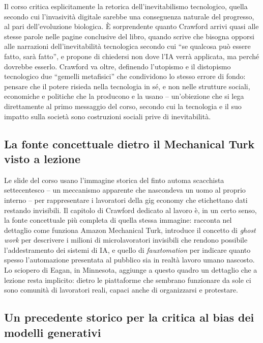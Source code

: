 \documentclass[a4paper,11pt]{article}
\begin{document}
Il corso critica esplicitamente la retorica dell'inevitabilismo tecnologico, quella secondo cui l'invasività digitale sarebbe una conseguenza naturale del progresso, al pari dell'evoluzione biologica. È sorprendente quanto Crawford arrivi quasi alle stesse parole nelle pagine conclusive del libro, quando scrive che bisogna opporsi alle narrazioni dell'inevitabilità tecnologica secondo cui ``se qualcosa può essere fatto, sarà fatto'', e propone di chiedersi non dove l'IA verrà applicata, ma perché dovrebbe esserlo. Crawford va oltre, definendo l'utopismo e il distopismo tecnologico due ``gemelli metafisici'' che condividono lo stesso errore di fondo: pensare che il potere risieda nella tecnologia in sé, e non nelle strutture sociali, economiche e politiche che la producono e la usano -- un'obiezione che si lega direttamente al primo messaggio del corso, secondo cui la tecnologia e il suo impatto sulla società sono costruzioni sociali prive di inevitabilità.

\subsection{La fonte concettuale dietro il Mechanical Turk visto a lezione}

Le slide del corso usano l'immagine storica del finto automa scacchista settecentesco -- un meccanismo apparente che nascondeva un uomo al proprio interno -- per rappresentare i lavoratori della gig economy che etichettano dati restando invisibili. Il capitolo di Crawford dedicato al lavoro è, in un certo senso, la fonte concettuale più completa di quella stessa immagine: racconta nel dettaglio come funziona Amazon Mechanical Turk, introduce il concetto di \emph{ghost work} per descrivere i milioni di microlavoratori invisibili che rendono possibile l'addestramento dei sistemi di IA, e quello di \emph{fauxtomation} per indicare quanto spesso l'automazione presentata al pubblico sia in realtà lavoro umano nascosto. Lo sciopero di Eagan, in Minnesota, aggiunge a questo quadro un dettaglio che a lezione resta implicito: dietro le piattaforme che sembrano funzionare da sole ci sono comunità di lavoratori reali, capaci anche di organizzarsi e protestare.

\subsection{Un precedente storico per la critica al bias dei modelli generativi}
\end{document}

